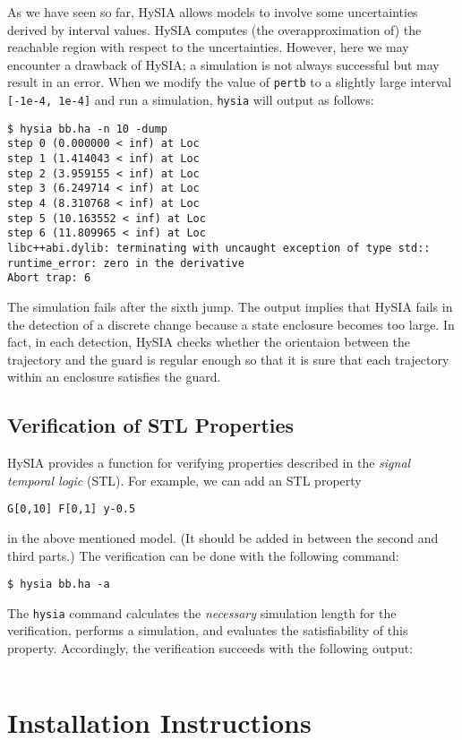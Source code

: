 \documentclass[10pt,a4paper]{article}
\begin{document}
As we have seen so far, HySIA allows models to involve some uncertainties derived by interval values.
HySIA computes (the overapproximation of) the reachable region with respect to the uncertainties.
However, here we may encounter a drawback of HySIA; a simulation is not always successful but may result in an error.
%
When we modify the value of \verb|pertb| to a slightly large interval \verb|[-1e-4, 1e-4]| and run a simulation, \verb|hysia| will output as follows:
\begin{verbatim}
$ hysia bb.ha -n 10 -dump
step 0 (0.000000 < inf) at Loc
step 1 (1.414043 < inf) at Loc
step 2 (3.959155 < inf) at Loc
step 3 (6.249714 < inf) at Loc
step 4 (8.310768 < inf) at Loc
step 5 (10.163552 < inf) at Loc
step 6 (11.809965 < inf) at Loc
libc++abi.dylib: terminating with uncaught exception of type std::
runtime_error: zero in the derivative
Abort trap: 6
\end{verbatim}
The simulation fails after the sixth jump. The output implies that HySIA fails in the detection of a discrete change because a state enclosure becomes too large.
In fact, in each detection, HySIA checks whether the orientaion between the trajectory and the guard is regular enough so that it is sure that each trajectory within an enclosure satisfies the guard.


\subsection{Verification of STL Properties}

HySIA provides a function for verifying properties described in the \emph{signal temporal logic} (STL).
For example, we can add an STL property 
\begin{lstlisting}
G[0,10] F[0,1] y-0.5
\end{lstlisting}
in the above mentioned model.
(It should be added in between the second and third parts.)
The verification can be done with the following command:
\begin{verbatim}
$ hysia bb.ha -a
\end{verbatim}
The \verb|hysia| command calculates the \emph{necessary} simulation length for the verification, performs a simulation, and evaluates the satisfiability of this property.
Accordingly, the verification succeeds with the following output:
\begin{verbatim}
\end{verbatim}


\section{Installation Instructions}
\end{document}
